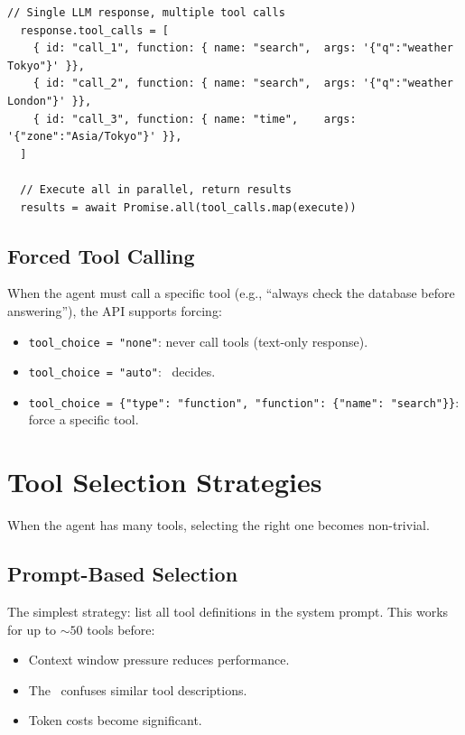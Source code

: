 \begin{lstlisting}[caption=Parallel tool call response]
  // Single LLM response, multiple tool calls
  response.tool_calls = [
    { id: "call_1", function: { name: "search",  args: '{"q":"weather Tokyo"}' }},
    { id: "call_2", function: { name: "search",  args: '{"q":"weather London"}' }},
    { id: "call_3", function: { name: "time",    args: '{"zone":"Asia/Tokyo"}' }},
  ]

  // Execute all in parallel, return results
  results = await Promise.all(tool_calls.map(execute))
\end{lstlisting}

\subsection{Forced Tool Calling}

When the agent must call a specific tool (e.g., ``always check the database before answering''), the API supports forcing:

\begin{itemize}
	\item \texttt{tool\_choice = "none"}: never call tools (text-only response).
	\item \texttt{tool\_choice = "auto"}: \llm\ decides.
	\item \texttt{tool\_choice = \{"type": "function", "function": \{"name": "search"\}\}}: force a specific tool.
\end{itemize}

\section{Tool Selection Strategies}

When the agent has many tools, selecting the right one becomes non-trivial.

\subsection{Prompt-Based Selection}

The simplest strategy: list all tool definitions in the system prompt. This works for up to $\sim 50$ tools before:
\begin{itemize}
	\item Context window pressure reduces performance.
	\item The \llm\ confuses similar tool descriptions.
	\item Token costs become significant.
\end{itemize}

